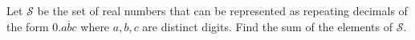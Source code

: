 Let $\mathcal{S}$ be the set of real numbers that can be represented as repeating decimals of the form $0.\overline{abc}$ where $a, b, c$ are distinct digits.  Find the sum of the elements of $\mathcal{S}$.